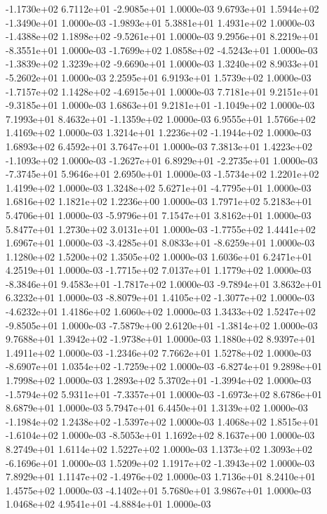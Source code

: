 -1.1730e+02  6.7112e+01 -2.9085e+01  1.0000e-03
 9.6793e+01  1.5944e+02 -1.3490e+01  1.0000e-03
-1.9893e+01  5.3881e+01  1.4931e+02  1.0000e-03
-1.4388e+02  1.1898e+02 -9.5261e+01  1.0000e-03
 9.2956e+01  8.2219e+01 -8.3551e+01  1.0000e-03
-1.7699e+02  1.0858e+02 -4.5243e+01  1.0000e-03
-1.3839e+02  1.3239e+02 -9.6690e+01  1.0000e-03
 1.3240e+02  8.9033e+01 -5.2602e+01  1.0000e-03
2.2595e+01 6.9193e+01 1.5739e+02  1.0000e-03
-1.7157e+02  1.1428e+02 -4.6915e+01  1.0000e-03
 7.7181e+01  9.2151e+01 -9.3185e+01  1.0000e-03
 1.6863e+01  9.2181e+01 -1.1049e+02  1.0000e-03
 7.1993e+01  8.4632e+01 -1.1359e+02  1.0000e-03
6.9555e+01 1.5766e+02 1.4169e+02  1.0000e-03
 1.3214e+01  1.2236e+02 -1.1944e+02  1.0000e-03
1.6893e+02 6.4592e+01 3.7647e+01  1.0000e-03
 7.3813e+01  1.4223e+02 -1.1093e+02  1.0000e-03
-1.2627e+01  6.8929e+01 -2.2735e+01  1.0000e-03
-7.3745e+01  5.9646e+01  2.6950e+01  1.0000e-03
-1.5734e+02  1.2201e+02  1.4199e+02  1.0000e-03
 1.3248e+02  5.6271e+01 -4.7795e+01  1.0000e-03
1.6816e+02 1.1821e+02 1.2236e+00  1.0000e-03
1.7971e+02 5.2183e+01 5.4706e+01  1.0000e-03
-5.9796e+01  7.1547e+01  3.8162e+01  1.0000e-03
5.8477e+01 1.2730e+02 3.0131e+01  1.0000e-03
-1.7755e+02  1.4441e+02  1.6967e+01  1.0000e-03
-3.4285e+01  8.0833e+01 -8.6259e+01  1.0000e-03
1.1280e+02 1.5200e+02 1.3505e+02  1.0000e-03
1.6036e+01 6.2471e+01 4.2519e+01  1.0000e-03
-1.7715e+02  7.0137e+01  1.1779e+02  1.0000e-03
-8.3846e+01  9.4583e+01 -1.7817e+02  1.0000e-03
-9.7894e+01  3.8632e+01  6.3232e+01  1.0000e-03
-8.8079e+01  1.4105e+02 -1.3077e+02  1.0000e-03
-4.6232e+01  1.4186e+02  1.6060e+02  1.0000e-03
 1.3433e+02  1.5247e+02 -9.8505e+01  1.0000e-03
-7.5879e+00  2.6120e+01 -1.3814e+02  1.0000e-03
 9.7688e+01  1.3942e+02 -1.9738e+01  1.0000e-03
1.1880e+02 8.9397e+01 1.4911e+02  1.0000e-03
-1.2346e+02  7.7662e+01  1.5278e+02  1.0000e-03
-8.6907e+01  1.0354e+02 -1.7259e+02  1.0000e-03
-6.8274e+01  9.2898e+01  1.7998e+02  1.0000e-03
 1.2893e+02  5.3702e+01 -1.3994e+02  1.0000e-03
-1.5794e+02  5.9311e+01 -7.3357e+01  1.0000e-03
-1.6973e+02  8.6786e+01  8.6879e+01  1.0000e-03
5.7947e+01 6.4450e+01 1.3139e+02  1.0000e-03
-1.1984e+02  1.2438e+02 -1.5397e+02  1.0000e-03
 1.4068e+02  1.8515e+01 -1.6104e+02  1.0000e-03
-8.5053e+01  1.1692e+02  8.1637e+00  1.0000e-03
8.2749e+01 1.6114e+02 1.5227e+02  1.0000e-03
 1.1373e+02  1.3093e+02 -6.1696e+01  1.0000e-03
 1.5209e+02  1.1917e+02 -1.3943e+02  1.0000e-03
 7.8929e+01  1.1147e+02 -1.4976e+02  1.0000e-03
1.7136e+01 8.2410e+01 1.4575e+02  1.0000e-03
-4.1402e+01  5.7680e+01  3.9867e+01  1.0000e-03
 1.0468e+02  4.9541e+01 -4.8884e+01  1.0000e-03
